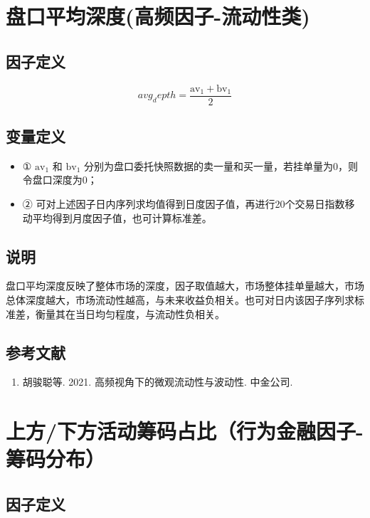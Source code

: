 \documentclass{article}
\begin{document}
\section{盘口平均深度(高频因子-流动性类)}

\subsection{因子定义}
\begin{equation}
    avg_depth = \frac{\mathrm{av}_1 + \mathrm{bv}_1}{2}
\end{equation}

\subsection{变量定义}
\begin{itemize}
    \item ① \( \mathrm{av}_1 \) 和 \( \mathrm{bv}_1 \) 分别为盘口委托快照数据的卖一量和买一量，若挂单量为0，则令盘口深度为0；
    \item ② 可对上述因子日内序列求均值得到日度因子值，再进行20个交易日指数移动平均得到月度因子值，也可计算标准差。
\end{itemize}

\subsection{说明}
盘口平均深度反映了整体市场的深度，因子取值越大，市场整体挂单量越大，市场总体深度越大，市场流动性越高，与未来收益负相关。也可对日内该因子序列求标准差，衡量其在当日均匀程度，与流动性负相关。

\subsection{参考文献}
\begin{enumerate}
    \item 胡骏聪等. 2021. 高频视角下的微观流动性与波动性. 中金公司.
\end{enumerate}

\section{上方/下方活动筹码占比（行为金融因子-筹码分布）}

\subsection{因子定义}
\end{document}
